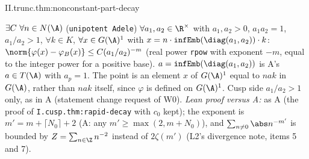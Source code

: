 \begin{tfformal}{II.trunc.thm:nonconstant-part-decay}
\begin{tffidelity}
$\exists C\ \forall n\in N(\A)$ (\texttt{unipotent Adele}) $\forall a_1,a_2\in\R^\times$ with $a_1,a_2>0$, $a_1a_2=1$, $a_1/a_2>1$, $\forall k\in K$, $\forall x\in G(\A)^1$ with $x=n\cdot\texttt{infEmb}(\diag(a_1,a_2))\cdot k$: $\norm{\varphi(x)-\varphi_B(x)}\le C(a_1/a_2)^{-m}$ (real power \texttt{rpow} with exponent $-m$, equal to the integer power for a positive base). $a=\texttt{infEmb}(\diag(a_1,a_2))$ is A's $a\in T(\A)$ with $a_p=1$. The point is an element $x$ of $G(\A)^1$ equal to $nak$ in $G(\A)$, rather than $nak$ itself, since $\varphi$ is defined on $G(\A)^1$. Cusp side $a_1/a_2>1$ only, as in A (statement change request of W0). \emph{Lean proof versus A:} as A (the proof of \texttt{I.cusp.thm:rapid-decay} with $c_0$ kept); the exponent is $m'=m+\lceil N_0\rceil+2$ (A: any $m'\ge\max(2,m+N_0)$), and $\sum_{n\ne0}\abs n^{-m'}$ is bounded by $Z=\sum_{n\in\Z}n^{-2}$ instead of $2\zeta(m')$ (L2's divergence note, items 5 and 7).
\end{tffidelity}
\end{tfformal}
